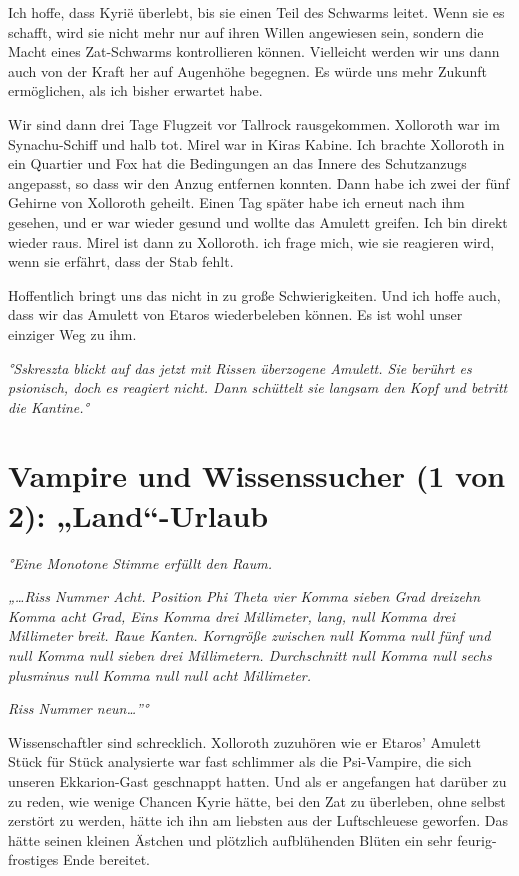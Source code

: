 \documentclass[11pt]{article}
\begin{document}
Ich hoffe, dass Kyrië überlebt, bis sie einen Teil des Schwarms leitet.
Wenn sie es schafft, wird sie nicht mehr nur auf ihren Willen angewiesen
sein, sondern die Macht eines Zat-Schwarms kontrollieren können.
Vielleicht werden wir uns dann auch von der Kraft her auf Augenhöhe
begegnen. Es würde uns mehr Zukunft ermöglichen, als ich bisher erwartet
habe.

Wir sind dann drei Tage Flugzeit vor Tallrock rausgekommen. Xolloroth
war im Synachu-Schiff und halb tot. Mirel war in Kiras Kabine. Ich
brachte Xolloroth in ein Quartier und Fox hat die Bedingungen an das
Innere des Schutzanzugs angepasst, so dass wir den Anzug entfernen
konnten. Dann habe ich zwei der fünf Gehirne von Xolloroth geheilt.
Einen Tag später habe ich erneut nach ihm gesehen, und er war wieder
gesund und wollte das Amulett greifen. Ich bin direkt wieder raus. Mirel
ist dann zu Xolloroth. ich frage mich, wie sie reagieren wird, wenn sie
erfährt, dass der Stab fehlt.

Hoffentlich bringt uns das nicht in zu große Schwierigkeiten. Und ich
hoffe auch, dass wir das Amulett von Etaros wiederbeleben können. Es ist
wohl unser einziger Weg zu ihm.

\emph{°Sskreszta blickt auf das jetzt mit Rissen überzogene Amulett. Sie
berührt es psionisch, doch es reagiert nicht. Dann schüttelt sie langsam
den Kopf und betritt die Kantine.°}

\section{Vampire und Wissenssucher (1 von 2): „Land``-Urlaub}

\emph{°Eine Monotone Stimme erfüllt den Raum.}

\emph{„\ldots{}Riss Nummer Acht. Position Phi Theta vier Komma sieben
Grad dreizehn Komma acht Grad, Eins Komma drei Millimeter, lang, null
Komma drei Millimeter breit. Raue Kanten. Korngröße zwischen null Komma
null fünf und null Komma null sieben drei Millimetern. Durchschnitt null
Komma null sechs plusminus null Komma null null acht Millimeter.}

\emph{Riss Nummer neun\ldots{}''°}

Wissenschaftler sind schrecklich. Xolloroth zuzuhören wie er Etaros'
Amulett Stück für Stück analysierte war fast schlimmer als die
Psi-Vampire, die sich unseren Ekkarion-Gast geschnappt hatten. Und als
er angefangen hat darüber zu zu reden, wie wenige Chancen Kyrie hätte,
bei den Zat zu überleben, ohne selbst zerstört zu werden, hätte ich ihn
am liebsten aus der Luftschleuese geworfen. Das hätte seinen kleinen
Ästchen und plötzlich aufblühenden Blüten ein sehr feurig-frostiges Ende
bereitet.
\end{document}
